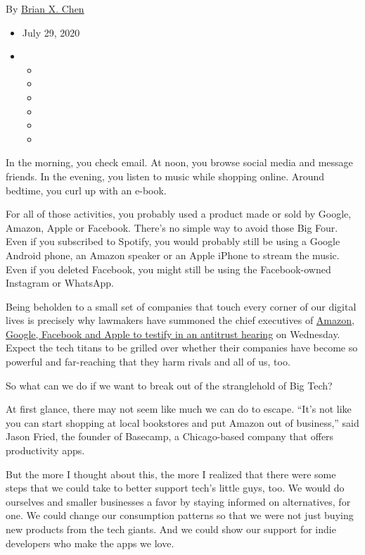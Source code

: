 By \href{https://www.nytimes3xbfgragh.onion/by/brian-x-chen}{Brian X.
Chen}

\begin{itemize}
\item
  July 29, 2020
\item
  \begin{itemize}
  \item
  \item
  \item
  \item
  \item
  \item
  \end{itemize}
\end{itemize}

In the morning, you check email. At noon, you browse social media and
message friends. In the evening, you listen to music while shopping
online. Around bedtime, you curl up with an e-book.

For all of those activities, you probably used a product made or sold by
Google, Amazon, Apple or Facebook. There's no simple way to avoid those
Big Four. Even if you subscribed to Spotify, you would probably still be
using a Google Android phone, an Amazon speaker or an Apple iPhone to
stream the music. Even if you deleted Facebook, you might still be using
the Facebook-owned Instagram or WhatsApp.

Being beholden to a small set of companies that touch every corner of
our digital lives is precisely why lawmakers have summoned the chief
executives of
\href{https://www.nytimes3xbfgragh.onion/2020/07/28/technology/amazon-apple-facebook-google-antitrust-hearing.html}{Amazon,
Google, Facebook and Apple to testify in an antitrust hearing} on
Wednesday. Expect the tech titans to be grilled over whether their
companies have become so powerful and far-reaching that they harm rivals
and all of us, too.

So what can we do if we want to break out of the stranglehold of Big
Tech?

At first glance, there may not seem like much we can do to escape.
``It's not like you can start shopping at local bookstores and put
Amazon out of business,'' said Jason Fried, the founder of Basecamp, a
Chicago-based company that offers productivity apps.

But the more I thought about this, the more I realized that there were
some steps that we could take to better support tech's little guys, too.
We would do ourselves and smaller businesses a favor by staying informed
on alternatives, for one. We could change our consumption patterns so
that we were not just buying new products from the tech giants. And we
could show our support for indie developers who make the apps we love.


